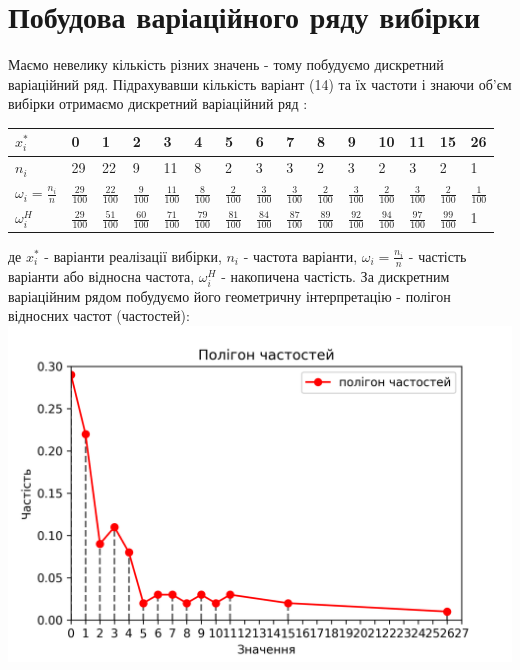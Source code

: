 \documentclass{article}
\begin{document}
\section{Побудова варіаційного ряду вибірки }
Маємо невелику кількість різних значень - тому побудуємо 
дискретний варіаційний ряд.
Підрахувавши кількість варіант (14) та їх частоти і знаючи 
об’єм вибірки отримаємо 
дискретний варіаційний ряд :
\newline
\newline
\begin{tabular}{|p{44pt}|p{13pt}|p{13pt}|p{13pt}|p{13pt}
  |p{13pt}|p{13pt}|p{13pt}|p{13pt}|p{13pt}|p{13pt}|p{13pt}
  |p{13pt}|p{13pt}|p{13pt}|}
  \hline
  $x_i^*$& 0 & 1 & 2 & 3 & 4 & 5 & 6 & 7 & 8 & 9 & 10 & 11 & 15 & 26\\
  \hline
  $n_i$& 29 & 22 & 9 & 11 & 8 & 2 & 3 & 3 & 2 & 3 & 2 & 3 & 2 & 1\\
  \hline
  $\omega_i = \frac{n_i}{n}$ & $\frac{29}{100}$ & 
  $\frac{22}{100}$ & $\frac{9}{100}$ & $\frac{11}{100}$ & 
  $\frac{8}{100}$ & $\frac{2}{100}$ & $\frac{3}{100}$ 
  & $\frac{3}{100}$ & $\frac{2}{100}$ & $\frac{3}{100}$ & 
  $\frac{2}{100}$ & $\frac{3}{100}$ & $\frac{2}{100}$ & 
  $\frac{1}{100}$\\
  \hline
  $\omega_i^H$&$\frac{29}{100}$&$\frac{51}{100}$&$\frac{60}{100}$&
  $\frac{71}{100}$&$\frac{79}{100}$&$\frac{81}{100}$&$\frac{84}{100}$&
  $\frac{87}{100}$&$\frac{89}{100}$&$\frac{92}{100}$&$\frac{94}{100}$&
  $\frac{97}{100}$&$\frac{99}{100}$&1\\
  \hline
\end{tabular}
\newline
\newline
де $x_i^*$ - варіанти реалізації вибірки, $n_i$ - частота 
варіанти, $\omega_i = \frac{n_i}{n}$ - частість варіанти або 
відносна частота, $\omega_i^H$ - накопичена частість.
\newline
За дискретним варіаційним рядом побудуємо його геометричну 
інтерпретацію - полігон відносних частот (частостей):
\newline
\includegraphics[scale = 0.9]{pol}
\end{document}
